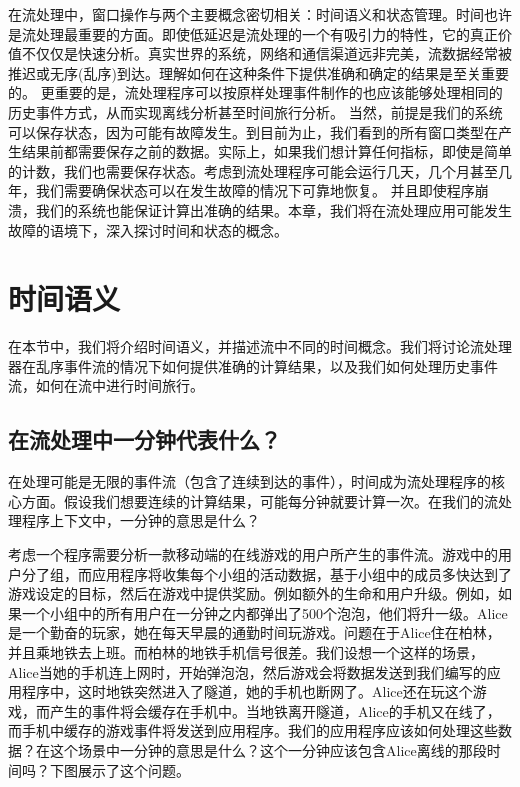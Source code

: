\documentclass[cn,11pt,chinese]{elegantbook}
\begin{document}
在流处理中，窗口操作与两个主要概念密切相关：时间语义和状态管理。时间也许是流处理最重要的方面。即使低延迟是流处理的一个有吸引力的特性，它的真正价值不仅仅是快速分析。真实世界的系统，网络和通信渠道远非完美，流数据经常被推迟或无序(乱序)到达。理解如何在这种条件下提供准确和确定的结果是至关重要的。
更重要的是，流处理程序可以按原样处理事件制作的也应该能够处理相同的历史事件方式，从而实现离线分析甚至时间旅行分析。
当然，前提是我们的系统可以保存状态，因为可能有故障发生。到目前为止，我们看到的所有窗口类型在产生结果前都需要保存之前的数据。实际上，如果我们想计算任何指标，即使是简单的计数，我们也需要保存状态。考虑到流处理程序可能会运行几天，几个月甚至几年，我们需要确保状态可以在发生故障的情况下可靠地恢复。
并且即使程序崩溃，我们的系统也能保证计算出准确的结果。本章，我们将在流处理应用可能发生故障的语境下，深入探讨时间和状态的概念。

\hypertarget{ux65f6ux95f4ux8bedux4e49}{%
\section{时间语义}\label{ux65f6ux95f4ux8bedux4e49}}

在本节中，我们将介绍时间语义，并描述流中不同的时间概念。我们将讨论流处理器在乱序事件流的情况下如何提供准确的计算结果，以及我们如何处理历史事件流，如何在流中进行时间旅行。

\hypertarget{ux5728ux6d41ux5904ux7406ux4e2dux4e00ux5206ux949fux4ee3ux8868ux4ec0ux4e48}{%
\subsection{在流处理中一分钟代表什么？}\label{ux5728ux6d41ux5904ux7406ux4e2dux4e00ux5206ux949fux4ee3ux8868ux4ec0ux4e48}}

在处理可能是无限的事件流（包含了连续到达的事件），时间成为流处理程序的核心方面。假设我们想要连续的计算结果，可能每分钟就要计算一次。在我们的流处理程序上下文中，一分钟的意思是什么？

考虑一个程序需要分析一款移动端的在线游戏的用户所产生的事件流。游戏中的用户分了组，而应用程序将收集每个小组的活动数据，基于小组中的成员多快达到了游戏设定的目标，然后在游戏中提供奖励。例如额外的生命和用户升级。例如，如果一个小组中的所有用户在一分钟之内都弹出了500个泡泡，他们将升一级。Alice是一个勤奋的玩家，她在每天早晨的通勤时间玩游戏。问题在于Alice住在柏林，并且乘地铁去上班。而柏林的地铁手机信号很差。我们设想一个这样的场景，Alice当她的手机连上网时，开始弹泡泡，然后游戏会将数据发送到我们编写的应用程序中，这时地铁突然进入了隧道，她的手机也断网了。Alice还在玩这个游戏，而产生的事件将会缓存在手机中。当地铁离开隧道，Alice的手机又在线了，而手机中缓存的游戏事件将发送到应用程序。我们的应用程序应该如何处理这些数据？在这个场景中一分钟的意思是什么？这个一分钟应该包含Alice离线的那段时间吗？下图展示了这个问题。
\end{document}
